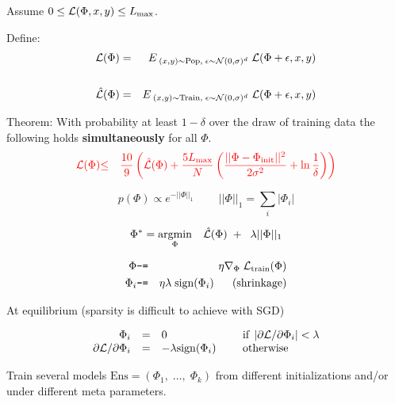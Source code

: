 {

Assume $0 \leq {\cal L}(\Phi,x,y) \leq L_{\max}$.

\vfill
Define:
\begin{eqnarray*}
{\cal L}(\Phi) & = & E_{\;(x,y)\sim \mathrm{Pop},\;\epsilon \sim {\cal N}(0,\sigma)^d}\;{{\cal L}(\Phi+\epsilon,x,y)} \\
\\
\hat{{\cal L}}(\Phi) & = & E_{\;(x,y)\sim \mathrm{Train},\;\epsilon \sim {\cal N}(0,\sigma)^d}\;{{\cal L}(\Phi+\epsilon,x,y)} \\
\end{eqnarray*}

\vfill
Theorem: With probability at least $1-\delta$ over the draw of training data the following holds {\bf simultaneously} for all $\Phi$.
\begin{eqnarray*}
   {\color{red} {\cal L}(\Phi)} & {\color{red} \leq} & {\color{red} \frac{10}{9}\left(\hat{{\cal L}}(\Phi)
   + \frac{5 L_{\max}}{N}\left(\frac{||\Phi-\Phi_{\mathrm{init}}||^2}{2\sigma^2} + \ln \frac{1}{\delta}\right)\right)}
\end{eqnarray*}




$$p(\Phi) \propto e^{-||\Phi||_1} \;\;\;\;\;\;\;\;||\Phi||_1 = \sum_i |\Phi_i|$$

$$\Phi^* = \operatorname*{argmin}_\Phi \; \;\;\hat{\cal L}(\Phi) \;+ \; \;\lambda||\Phi||_1$$

\begin{eqnarray*}
  \Phi & \mbox{\tt -=} & \eta \nabla_\Phi \; {\cal L}_{\mathrm{train}}(\Phi) \\
  \Phi_i & \mbox{\tt -=} & \eta\lambda\; \mathrm{sign}(\Phi_i) \;\;\;\;\;\;\mbox{(shrinkage)}
\end{eqnarray*}

\vfill
At equilibrium \hfill (sparsity is difficult to achieve with SGD)

$$\begin{array}{rcll}
\Phi_i &  = & 0  & \;\;\;\;\;\mbox{if} \;\left|\partial {\cal L} /\partial \Phi_i\right| <  \lambda \\
\partial {\cal L} /\partial \Phi_i & = &  -\lambda \mathrm{sign}(\Phi_i) &\;\;\;\;\; \mbox{otherwise}
\end{array}$$



Train several models $\mathrm{Ens} = (\Phi_1,\;\ldots,\; \Phi_k)$ from different initializations and/or under different meta parameters.

}

